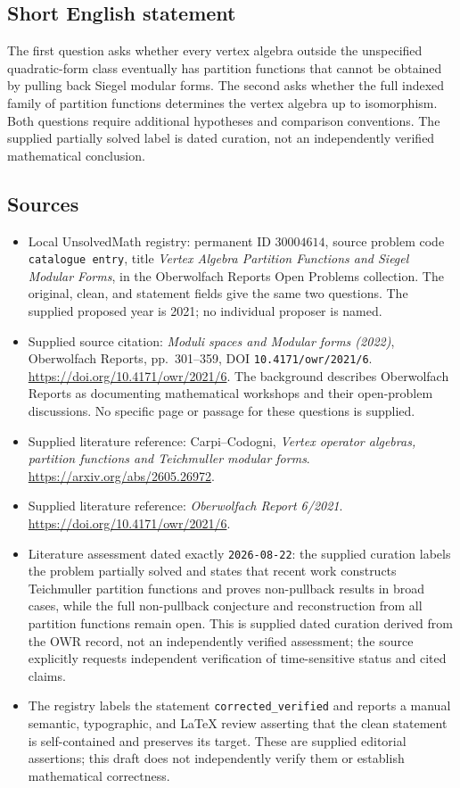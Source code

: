 \documentclass[11pt]{article}
\begin{document}
\subsection{Short English statement}
The first question asks whether every vertex algebra outside the unspecified quadratic-form class eventually has partition functions that cannot be obtained by pulling back Siegel modular forms. The second asks whether the full indexed family of partition functions determines the vertex algebra up to isomorphism. Both questions require additional hypotheses and comparison conventions. The supplied partially solved label is dated curation, not an independently verified mathematical conclusion.
\subsection{Sources}
\begin{itemize}
\item Local UnsolvedMath registry: permanent ID \(30004614\), source problem code \texttt{catalogue entry}, title \emph{Vertex Algebra Partition Functions and Siegel Modular Forms}, in the Oberwolfach Reports Open Problems collection. The original, clean, and statement fields give the same two questions. The supplied proposed year is 2021; no individual proposer is named.
\item Supplied source citation: \emph{Moduli spaces and Modular forms (2022)}, Oberwolfach Reports, pp.\ 301--359, DOI \texttt{10.4171/owr/2021/6}. \url{https://doi.org/10.4171/owr/2021/6}. The background describes Oberwolfach Reports as documenting mathematical workshops and their open-problem discussions. No specific page or passage for these questions is supplied.
\item Supplied literature reference: Carpi--Codogni, \emph{Vertex operator algebras, partition functions and Teichmuller modular forms}. \url{https://arxiv.org/abs/2605.26972}.
\item Supplied literature reference: \emph{Oberwolfach Report 6/2021}. \url{https://doi.org/10.4171/owr/2021/6}.
\item Literature assessment dated exactly \texttt{2026-08-22}: the supplied curation labels the problem partially solved and states that recent work constructs Teichmuller partition functions and proves non-pullback results in broad cases, while the full non-pullback conjecture and reconstruction from all partition functions remain open. This is supplied dated curation derived from the OWR record, not an independently verified assessment; the source explicitly requests independent verification of time-sensitive status and cited claims.
\item The registry labels the statement \texttt{corrected\_verified} and reports a manual semantic, typographic, and LaTeX review asserting that the clean statement is self-contained and preserves its target. These are supplied editorial assertions; this draft does not independently verify them or establish mathematical correctness.
\end{itemize}
\end{document}
